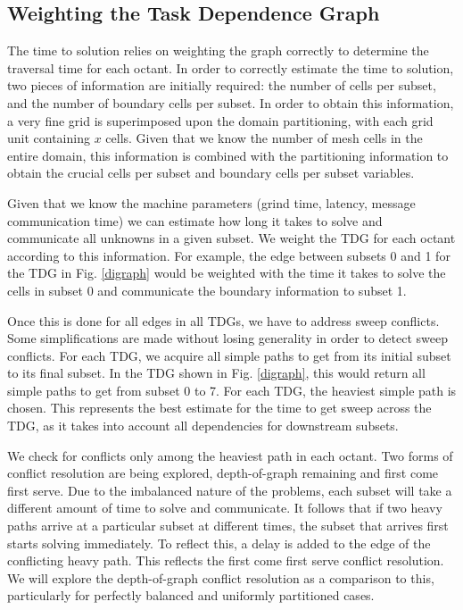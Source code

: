\documentclass[11pt, letterpaper,titlepage,oneside]{article}
\begin{document}
\subsection{Weighting the Task Dependence Graph}\label{weighting_graphs}

The time to solution relies on weighting the graph correctly to determine the traversal time for each octant. In order to correctly estimate the time to solution, two pieces of information are initially required: the number of cells per subset, and the number of boundary cells per subset. In order to obtain this information, a very fine grid is superimposed upon the domain partitioning, with each grid unit containing $x$ cells. Given that we know the number of mesh cells in the entire domain, this information is combined with the partitioning information to obtain the crucial cells per subset and boundary cells per subset variables. 

Given that we know the machine parameters (grind time, latency, message communication time) we can estimate how long it takes to solve and communicate all unknowns in a given subset. We weight the TDG for each octant according to this information. For example, the edge between subsets 0 and 1 for the TDG in Fig. \ref{digraph} would be weighted with the time it takes to solve the cells in subset 0 and communicate the boundary information to subset 1. 

Once this is done for all edges in all TDGs, we have to address sweep conflicts. Some simplifications are made without losing generality in order to detect sweep conflicts. For each TDG, we acquire all simple paths to get from its initial subset to its final subset. In the TDG shown in Fig. \ref{digraph}, this would return all simple paths to get from subset 0 to 7. For each TDG, the heaviest simple path is chosen. This represents the best estimate for the time to get sweep across the TDG, as it takes into account all dependencies for downstream subsets. 

We check for conflicts only among the heaviest path in each octant. Two forms of conflict resolution are being explored, depth-of-graph remaining and first come first serve. Due to the imbalanced nature of the problems, each subset will take a different amount of time to solve and communicate. It follows that if two heavy paths arrive at a particular subset at different times, the subset that arrives first starts solving immediately. To reflect this, a delay is added to the edge of the conflicting heavy path. This reflects the first come first serve conflict resolution. We will explore the depth-of-graph conflict resolution as a comparison to this, particularly for perfectly balanced and uniformly partitioned cases.
\end{document}
